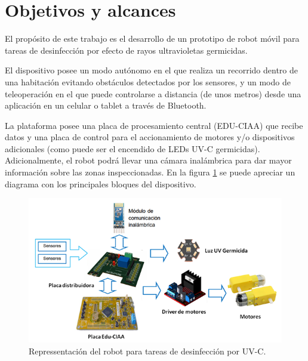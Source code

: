 
\section{Objetivos y alcances}


El propósito de este trabajo es el desarrollo de un prototipo de robot móvil para tareas de desinfección por efecto de rayos ultravioletas germicidas. 

El dispositivo posee un modo autónomo en el que realiza un recorrido dentro de una habitación evitando obstáculos detectados por los sensores, y un modo de teleoperación en el que puede controlarse a distancia (de unos metros) desde una aplicación en un celular o tablet a través de Bluetooth. 

La plataforma posee una placa de procesamiento central (EDU-CIAA) que recibe datos y una placa de control para el accionamiento de motores y/o dispositivos adicionales (como puede ser el encendido de LEDs UV-C germicidas). Adicionalmente, el robot podrá llevar una cámara inalámbrica para dar mayor información sobre las zonas inspeccionadas.  En la figura \ref{fig:blocks} se puede apreciar un diagrama con los principales bloques del dispositivo.


\begin{figure}[h]
	\centering
	\includegraphics[width=\textwidth]{./Figures/blocks.png}
	\caption{Repressentación del robot para tareas de desinfección por UV-C.}
	\label{fig:blocks}
\end{figure}



